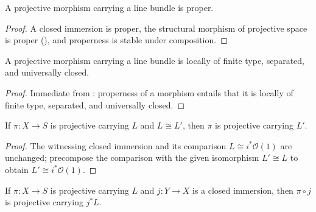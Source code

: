 \begin{lemma}
  \label{lem:projective_with_proper}
  \leanok
  A projective morphism carrying a line bundle is proper.
\end{lemma}

\begin{proof}
  \leanok
  A closed immersion is proper, the structural morphism of projective space
  is proper (), and properness is stable
  under composition.
\end{proof}

\begin{lemma}
  \label{lem:projective_with_structural}
  \leanok
  A projective morphism carrying a line bundle is locally of finite type,
  separated, and universally closed.
\end{lemma}

\begin{proof}
  \leanok
  Immediate from : properness of a morphism
  entails that it is locally of finite type, separated, and universally
  closed.
\end{proof}

\begin{lemma}
  \label{lem:projective_with_iso}
  \leanok
  If \(\pi : X \to S\) is projective carrying \(L\) and \(L \cong L'\), then
  \(\pi\) is projective carrying \(L'\).
\end{lemma}

\begin{proof}
  \leanok
  The witnessing closed immersion and its comparison
  \(L \cong i^* \mathcal{O}(1)\) are unchanged; precompose the comparison with
  the given isomorphism \(L' \cong L\) to obtain \(L' \cong i^*
  \mathcal{O}(1)\).
\end{proof}

\begin{lemma}
  \label{lem:projective_with_closed_immersion}
  \leanok
  If \(\pi : X \to S\) is projective carrying \(L\) and \(j : Y \to X\) is a
  closed immersion, then \(\pi \circ j\) is projective carrying \(j^* L\).
\end{lemma}

